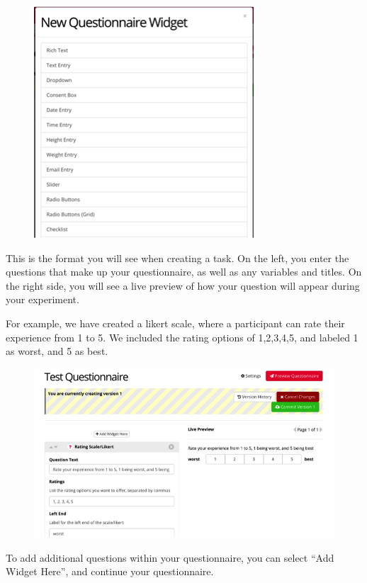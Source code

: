 \documentclass[]{book}
\begin{document}
\begin{figure}
\centering
\includegraphics{images/research_protocols/gorilla/gorilla9.png}
\caption{}
\end{figure}

This is the format you will see when creating a task. On the left, you enter the questions that make up your questionnaire, as well as any variables and titles. On the right side, you will see a live preview of how your question will appear during your experiment.

For example, we have created a likert scale, where a participant can rate their experience from 1 to 5. We included the rating options of 1,2,3,4,5, and labeled 1 as worst, and 5 as best.

\begin{figure}
\centering
\includegraphics{images/research_protocols/gorilla/gorilla10.png}
\caption{}
\end{figure}

To add additional questions within your questionnaire, you can select ``Add Widget Here'', and continue your questionnaire.
\end{document}
